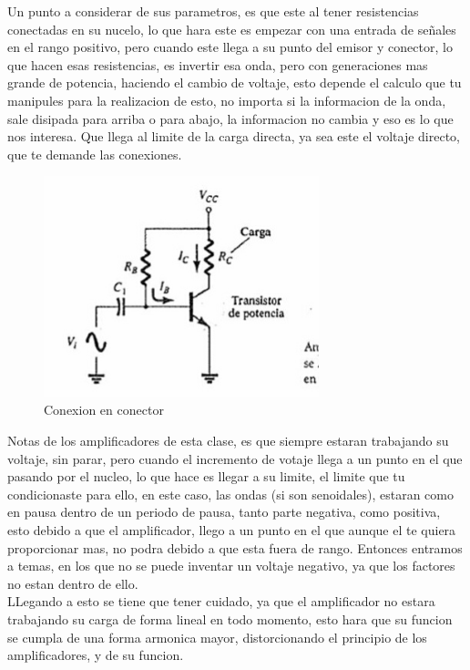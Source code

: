 \documentclass[12pt,a4paper]{article}
\begin{document}
Un  punto a considerar de sus parametros, es que este al tener resistencias conectadas en su nucelo, lo que hara este es empezar con una entrada de señales en el rango positivo, pero cuando este llega a su punto del emisor y conector, lo que hacen esas resistencias, es invertir esa onda, pero con generaciones mas grande de potencia, haciendo el cambio de voltaje, esto depende el calculo que tu manipules para la realizacion de esto, no importa si la informacion de la onda, sale disipada para arriba o para abajo, la informacion no cambia y eso es lo que nos interesa. Que llega al limite de la carga directa, ya sea este el voltaje directo, que te demande las conexiones.\\

\begin{figure}[hbtp]
\centering
\includegraphics[width=8cm]{2.jpg}
\caption{Conexion en conector}
\end{figure}

Notas de los amplificadores de esta clase, es que siempre estaran trabajando su voltaje, sin parar, pero cuando el incremento de votaje llega a un punto en el que pasando por el nucleo, lo que hace es llegar a su limite, el limite que tu condicionaste para ello, en este caso, las ondas (si son senoidales), estaran como en pausa dentro de un periodo de pausa, tanto parte negativa, como positiva, esto debido a que el amplificador, llego a un punto en el que aunque el te quiera proporcionar mas, no podra debido a que esta fuera de rango. Entonces entramos a temas, en los que no se puede inventar un voltaje negativo, ya que los factores no estan dentro de ello.\\
LLegando a esto se tiene que tener cuidado, ya que el amplificador no estara trabajando su carga de forma lineal en todo momento, esto hara que su funcion se cumpla de una forma armonica mayor, distorcionando el principio de los amplificadores, y de su funcion.\\
\end{document}
